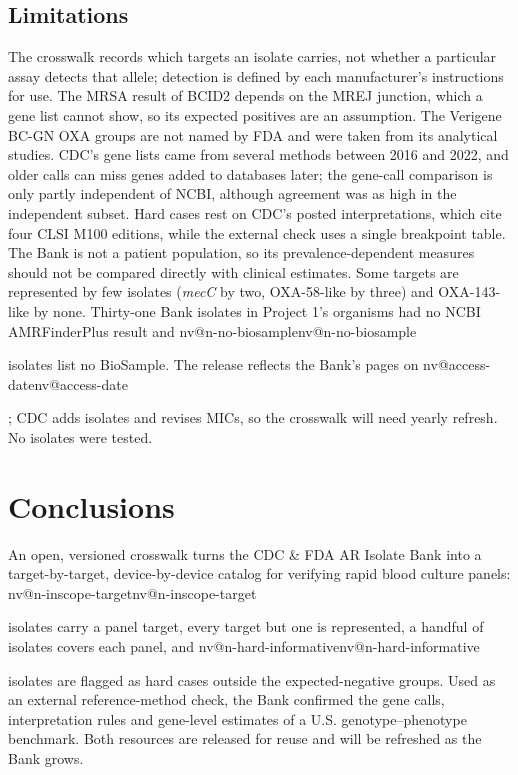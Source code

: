 \documentclass[10pt,twocolumn,letterpaper]{article}
\makeatletter
\newcommand{\nv}[1]{\ifcsname nv@#1\endcsname\csname nv@#1\endcsname\else
  \PackageError{numbers}{Unknown number key: #1}{Run build_assets.py}\fi}
\newcommand{\g}[1]{\textit{#1}}  %
\makeatother
\begin{document}
\subsection{Limitations}

The crosswalk records which targets an isolate carries, not whether a particular assay detects that allele; detection is
defined by each manufacturer's instructions for use. The MRSA result of BCID2 depends on the MREJ junction, which a gene
list cannot show, so its expected positives are an assumption. The Verigene BC-GN OXA groups are not named by FDA and were
taken from its analytical studies. CDC's gene lists came from several methods between 2016 and 2022, and older calls can
miss genes added to databases later; the gene-call comparison is only partly independent of NCBI, although agreement was as
high in the independent subset. Hard cases rest on CDC's posted interpretations, which cite four CLSI M100 editions, while
the external check uses a single breakpoint table. The Bank is not a patient population, so its prevalence-dependent
measures should not be compared directly with clinical estimates. Some targets are represented by few isolates
(\g{mecC} by two, OXA-58-like by three) and OXA-143-like by none. Thirty-one Bank isolates in Project 1's organisms had no
NCBI AMRFinderPlus result and \nv{n-no-biosample} isolates list no BioSample. The release reflects the Bank's pages on
\nv{access-date}; CDC adds isolates and revises MICs, so the crosswalk will need yearly refresh. No isolates were tested.

\section{Conclusions}\label{sec:conclusions}

An open, versioned crosswalk turns the CDC \& FDA AR Isolate Bank into a target-by-target, device-by-device catalog for
verifying rapid blood culture panels: \nv{n-inscope-target} isolates carry a panel target, every target but one is
represented, a handful of isolates covers each panel, and \nv{n-hard-informative} isolates are flagged as hard cases
outside the expected-negative groups. Used as an external reference-method check, the Bank confirmed the gene calls,
interpretation rules and gene-level estimates of a U.S. genotype--phenotype benchmark. Both resources are released for
reuse and will be refreshed as the Bank grows.

\end{document}
